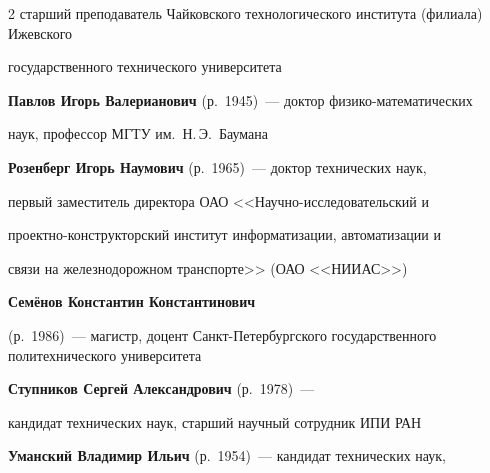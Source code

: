 \begin{multicols}{2}
старший преподаватель Чайковского технологического института (филиала) Ижевского 

государственного технического университета



\vspace*{6pt}



\noindent

\textbf{Павлов Игорь Валерианович} (р.\ 1945)~---  доктор фи\-зи\-ко-ма\-те\-ма\-ти\-че\-ских 

наук, профессор МГТУ им.\ Н.\,Э.~Баумана




\vspace*{6pt}



\noindent

\textbf{Розенберг Игорь Наумович} (р.\ 1965)~--- доктор технических наук, 

первый заместитель директора ОАО <<На\-уч\-но-ис\-сле\-до\-ва\-тель\-ский и 

проект\-но-кон\-ст\-рук\-тор\-ский институт информатизации, автоматизации и 

связи на железнодорожном транспорте>> (ОАО <<НИИАС>>) 



\vspace*{6pt}



\noindent

\textbf{Семёнов Константин Константинович} 

(р.\ 1986)~--- магистр, доцент Санкт-Пе\-тер\-бург\-ско\-го государственного политехнического  университета



\vspace*{6pt}



\noindent

\textbf{Ступников  Сергей Александрович}  (р.\ 1978)~--- 

кандидат технических  наук, старший научный сотрудник ИПИ РАН



\vspace*{6pt}



\noindent

\textbf{Уманский Владимир Ильич} (р.\ 1954)~--- кандидат технических наук, 


\end{multicols}
